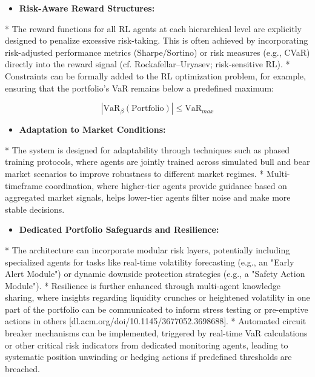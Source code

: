 \documentclass[11pt,a4paper]{article}
\begin{document}
\begin{itemize}
\item   \textbf{Risk-Aware Reward Structures:}
\end{itemize}
    *   The reward functions for all RL agents at each hierarchical level are explicitly designed to penalize excessive risk-taking. This is often achieved by incorporating risk-adjusted performance metrics (Sharpe/Sortino) or risk measures (e.g., CVaR) directly into the reward signal (cf. Rockafellar–Uryasev; risk‑sensitive RL).
    *   Constraints can be formally added to the RL optimization problem, for example, ensuring that the portfolio's VaR remains below a predefined maximum:
    
\begin{equation}
|\text{VaR}_\beta(\text{Portfolio})| \leq \text{VaR}_{max}
\end{equation}

\begin{itemize}
\item   \textbf{Adaptation to Market Conditions:}
\end{itemize}
    *   The system is designed for adaptability through techniques such as phased training protocols, where agents are jointly trained across simulated bull and bear market scenarios to improve robustness to different market regimes.
    *   Multi-timeframe coordination, where higher-tier agents provide guidance based on aggregated market signals, helps lower-tier agents filter noise and make more stable decisions.

\begin{itemize}
\item   \textbf{Dedicated Portfolio Safeguards and Resilience:}
\end{itemize}
    *   The architecture can incorporate modular risk layers, potentially including specialized agents for tasks like real-time volatility forecasting (e.g., an "Early Alert Module") or dynamic downside protection strategies (e.g., a "Safety Action Module").
    *   Resilience is further enhanced through multi-agent knowledge sharing, where insights regarding liquidity crunches or heightened volatility in one part of the portfolio can be communicated to inform stress testing or pre-emptive actions in others [dl.acm.org/doi/10.1145/3677052.3698688].
    *   Automated circuit breaker mechanisms can be implemented, triggered by real-time VaR calculations or other critical risk indicators from dedicated monitoring agents, leading to systematic position unwinding or hedging actions if predefined thresholds are breached.
\end{document}
